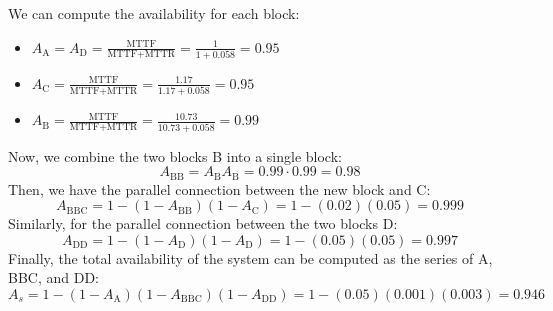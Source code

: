 \begin{enumerate}
        We can compute the availability for each block:
        \begin{itemize}
            \item $A_{\text{A}}=A_{\text{D}}=\frac{\text{MTTF}}{\text{MTTF}+\text{MTTR}}=\frac{1}{1+0.058}=0.95$
            \item $A_{\text{C}}=\frac{\text{MTTF}}{\text{MTTF}+\text{MTTR}}=\frac{1.17}{1.17+0.058}=0.95$
            \item $A_{\text{B}}=\frac{\text{MTTF}}{\text{MTTF}+\text{MTTR}}=\frac{10.73}{10.73+0.058}=0.99$
        \end{itemize}
        Now, we combine the two blocks B into a single block:
        \[A_{\text{BB}}=A_{\text{B}}A_{\text{B}}=0.99\cdot 0.99=0.98\]
        Then, we have the parallel connection between the new block and C:
        \[A_{\text{BBC}}=1-\left(1-A_{\text{BB}}\right)\left(1-A_{\text{C}}\right)=1-(0.02)(0.05)=0.999\]
        Similarly, for the parallel connection between the two blocks D:
        \[A_{\text{DD}}=1-\left(1-A_{\text{D}}\right)\left(1-A_{\text{D}}\right)=1-(0.05)(0.05)=0.997\]
        Finally, the total availability of the system can be computed as the series of A, BBC, and DD:
        \[A_{s}=1-\left(1-A_{\text{A}}\right)\left(1-A_{\text{BBC}}\right)\left(1-A_{\text{DD}}\right)=1-(0.05)(0.001)(0.003)=0.946\]
\end{enumerate}